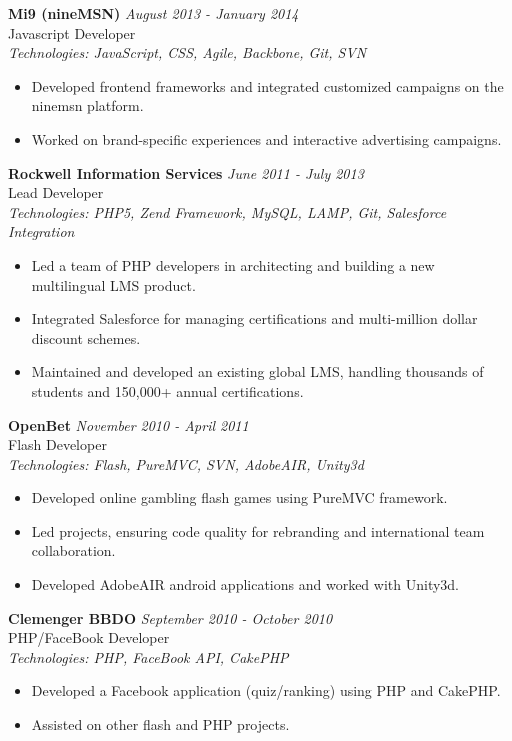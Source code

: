 \documentclass[a4paper,10pt]{article}
\begin{document}
\textbf{Mi9 (nineMSN)} \hfill \textit{August 2013 - January 2014} \\
Javascript Developer \\
\textit{Technologies: JavaScript, CSS, Agile, Backbone, Git, SVN}
\begin{itemize}
    \item Developed frontend frameworks and integrated customized campaigns on the ninemsn platform.
    \item Worked on brand-specific experiences and interactive advertising campaigns.
\end{itemize}

\textbf{Rockwell Information Services} \hfill \textit{June 2011 - July 2013} \\
Lead Developer \\
\textit{Technologies: PHP5, Zend Framework, MySQL, LAMP, Git, Salesforce Integration}
\begin{itemize}
    \item Led a team of PHP developers in architecting and building a new multilingual LMS product.
    \item Integrated Salesforce for managing certifications and multi-million dollar discount schemes.
    \item Maintained and developed an existing global LMS, handling thousands of students and 150,000+ annual certifications.
\end{itemize}

\textbf{OpenBet} \hfill \textit{November 2010 - April 2011} \\
Flash Developer \\
\textit{Technologies: Flash, PureMVC, SVN, AdobeAIR, Unity3d}
\begin{itemize}
    \item Developed online gambling flash games using PureMVC framework.
    \item Led projects, ensuring code quality for rebranding and international team collaboration.
    \item Developed AdobeAIR android applications and worked with Unity3d.
\end{itemize}

\textbf{Clemenger BBDO} \hfill \textit{September 2010 - October 2010} \\
PHP/FaceBook Developer \\
\textit{Technologies: PHP, FaceBook API, CakePHP}
\begin{itemize}
    \item Developed a Facebook application (quiz/ranking) using PHP and CakePHP.
    \item Assisted on other flash and PHP projects.
\end{itemize}
\end{document}
